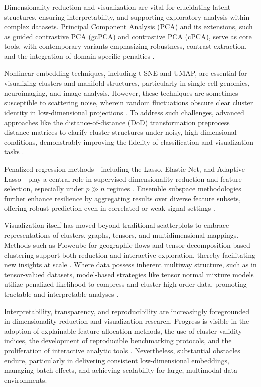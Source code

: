 Dimensionality reduction and visualization are vital for elucidating latent structures, ensuring interpretability, and supporting exploratory analysis within complex datasets. Principal Component Analysis (PCA) and its extensions, such as guided contrastive PCA (gcPCA) and contrastive PCA (cPCA), serve as core tools, with contemporary variants emphasizing robustness, contrast extraction, and the integration of domain-specific penalties \cite{ref97,ref99}.

Nonlinear embedding techniques, including t-SNE and UMAP, are essential for visualizing clusters and manifold structures, particularly in single-cell genomics, neuroimaging, and image analysis. However, these techniques are sometimes susceptible to scattering noise, wherein random fluctuations obscure clear cluster identity in low-dimensional projections \cite{ref99}. To address such challenges, advanced approaches like the distance-of-distance (DoD) transformation preprocess distance matrices to clarify cluster structures under noisy, high-dimensional conditions, demonstrably improving the fidelity of classification and visualization tasks \cite{ref99}.

Penalized regression methods—including the Lasso, Elastic Net, and Adaptive Lasso—play a central role in supervised dimensionality reduction and feature selection, especially under \(p \gg n\) regimes \cite{ref101}. Ensemble subspace methodologies further enhance resilience by aggregating results over diverse feature subsets, offering robust prediction even in correlated or weak-signal settings \cite{ref116}.

Visualization itself has moved beyond traditional scatterplots to embrace representations of clusters, graphs, tensors, and multidimensional mappings. Methods such as Flowcube for geographic flows and tensor decomposition-based clustering support both reduction and interactive exploration, thereby facilitating new insights at scale \cite{ref53,ref58,ref79,ref86,ref91,ref92,ref94,ref95,ref99}. Where data possess inherent multiway structure, such as in tensor-valued datasets, model-based strategies like tensor normal mixture models utilize penalized likelihood to compress and cluster high-order data, promoting tractable and interpretable analyses \cite{ref92}.

Interpretability, transparency, and reproducibility are increasingly foregrounded in dimensionality reduction and visualization research. Progress is visible in the adoption of explainable feature allocation methods, the use of cluster validity indices, the development of reproducible benchmarking protocols, and the proliferation of interactive analytic tools \cite{ref53,ref79,ref90,ref92,ref96,ref99}. Nevertheless, substantial obstacles endure, particularly in delivering consistent low-dimensional embeddings, managing batch effects, and achieving scalability for large, multimodal data environments.

